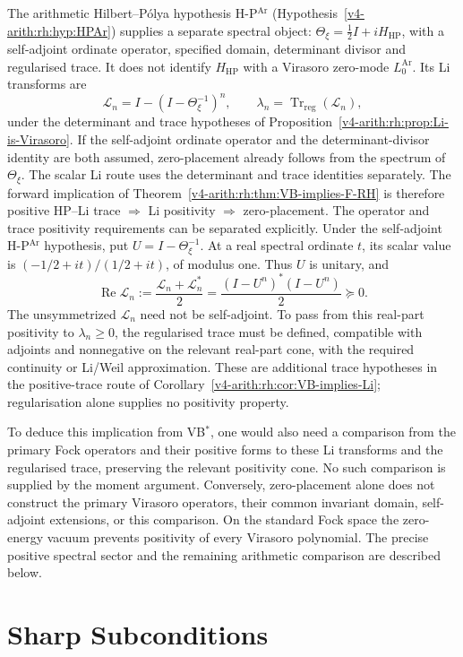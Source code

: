 The arithmetic Hilbert--P\'olya hypothesis H-P\(^{\mathrm{Ar}}\)
(Hypothesis~\ref{v4-arith:rh:hyp:HPAr}) supplies a separate spectral object:
\(\Theta_\xi=\tfrac12 I+iH_{\mathrm{HP}}\), with a self-adjoint
ordinate operator, specified domain, determinant divisor and
regularised trace. It does not identify \(H_{\mathrm{HP}}\) with a
Virasoro zero-mode \(L_0^{\mathrm{Ar}}\). Its Li transforms are
\[
 \mathcal L_n=I-(I-\Theta_\xi^{-1})^n,
 \qquad \lambda_n=\operatorname{Tr}_{\mathrm{reg}}(\mathcal L_n),
\]
under the determinant and trace hypotheses of
Proposition~\ref{v4-arith:rh:prop:Li-is-Virasoro}. If the self-adjoint ordinate
operator and the determinant-divisor identity are both assumed,
zero-placement already follows from the spectrum of
\(\Theta_\xi\). The scalar Li route uses the determinant and trace
identities separately.
The forward implication of
Theorem~\ref{v4-arith:rh:thm:VB-implies-F-RH} is therefore positive HP--Li
trace \(\Rightarrow\) Li positivity \(\Rightarrow\) zero-placement.
The operator and trace positivity requirements can be separated
explicitly. Under the self-adjoint H-P\(^{\mathrm{Ar}}\) hypothesis,
put \(U=I-\Theta_\xi^{-1}\). At a real spectral ordinate \(t\),
its scalar value is \((-1/2+it)/(1/2+it)\), of modulus one.
Thus \(U\) is unitary, and
\[
 \operatorname{Re}\mathcal L_n
 :=\frac{\mathcal L_n+\mathcal L_n^*}{2}
 =\frac{(I-U^n)^*(I-U^n)}2\succeq0.
\]
The unsymmetrized \(\mathcal L_n\) need not be self-adjoint.
To pass from this real-part positivity to \(\lambda_n\ge0\), the
regularised trace must be defined, compatible with adjoints and
nonnegative on the relevant real-part cone, with the required
continuity or Li/Weil approximation. These are additional trace
hypotheses in the positive-trace route of
Corollary~\ref{v4-arith:rh:cor:VB-implies-Li}; regularisation alone supplies
no positivity property.

To deduce this implication from VB\(^{*}\), one would also need a
comparison from the primary Fock operators and their positive forms
to these Li transforms and the regularised trace, preserving the
relevant positivity cone. No such comparison is supplied by the
moment argument. Conversely, zero-placement alone does not construct
the primary Virasoro operators, their common invariant domain,
self-adjoint extensions, or this comparison. On the standard Fock
space the zero-energy vacuum prevents positivity of every Virasoro
polynomial. The precise positive spectral sector and the remaining
arithmetic comparison are described below.

\section{Sharp Subconditions}
\label{v4-arith:sw:corrections}

